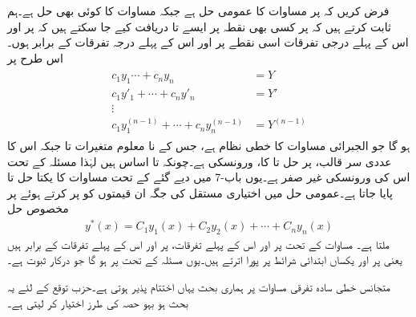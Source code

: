 
فرض کریں کہ  پر مساوات  کا عمومی حل  ہے جبکہ  مساوات  کا کوئی بھی حل ہے۔ہم ثابت کرتے ہیں کہ  پر کسی بھی نقطہ  پر ایسے  تا  دریافت کیے جا سکتے ہیں کہ  پر  اور اس کے پہلے  درجی تفرقات اسی نقطے پر  اور اس کے پہلے  درجہ تفرقات کے برابر ہوں۔ اس طرح  پر 
\begin{gather}
\begin{aligned}\label{مساوات_سادہ_بلند_ورونسکی_سے_مستقل}
c_1y_1\cdots+c_ny_n&=Y\\
c_1y'_1+\cdots+c_ny'_n&=Y'\\
\vdots &\\
c_1y^{(n-1)}_1+\cdots+c_ny^{(n-1)}_n&=Y^{(n-1)}
\end{aligned}
\end{gather}
ہو گا جو الجبرائی مساوات کا خطی نظام ہے، جس کے نا معلوم متغیرات  تا  جبکہ اس کا عددی سر قالب،  پر حل  تا  کا،  ورونسکی ہے۔چونکہ  تا  اساس ہیں لہٰذا مسئلہ  کے تحت اس کی ورونسکی غیر صفر ہے۔یوں باب-7 میں دیے گئے  کے تحت مساوات  کا یکتا حل 
  تا   پایا جاتا ہے۔عمومی حل میں اختیاری مستقل کی جگہ ان قیمتوں کو پر کرتے ہوئے  پر مخصوص حل
\begin{align*}
y^*(x)=C_1y_1(x)+C_2y_2(x)+\cdots+C_ny_n(x)
\end{align*}
ملتا ہے۔ مساوات  کے تحت  پر  اور اس کے پہلے  تفرقات،  پر  اور اس کے پہلے  تفرقات کے برابر ہیں یعنی  پر  اور  یکساں ابتدائی شرائط پر پورا اترتے ہیں۔یوں مسئلہ  کے تحت  پر  ہو گا جو درکار ثبوت ہے۔

متجانس خطی سادہ تفرقی مساوات پر ہماری بحث یہاں اختتام پذیر ہوتی ہے۔حزب توقع  کے لئے یہ بحث ہو بہو حصہ  کی طرز اختیار کر لیتی ہے۔

